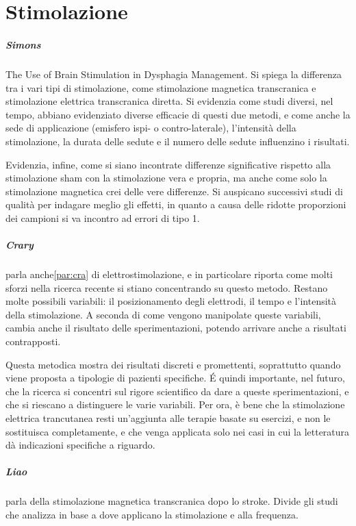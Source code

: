 \chapter{Stimolazione}
\paragraph{Simons }\label{par:sim}\cite{Simons2017} The Use of Brain 
Stimulation in Dysphagia 
Management.
Si spiega la differenza tra i vari tipi di stimolazione, come stimolazione 
magnetica transcranica e stimolazione elettrica transcranica diretta.
Si evidenzia come studi diversi, nel tempo, abbiano evidenziato diverse 
efficacie di questi due metodi, e come anche la sede di applicazione (emisfero 
ispi- o contro-laterale), l'intensità della stimolazione, la durata delle 
sedute e il numero delle sedute influenzino i risultati.

Evidenzia, infine, come si siano incontrate differenze significative rispetto 
alla stimolazione sham con la stimolazione vera e propria, ma anche come solo 
la stimolazione magnetica crei delle vere differenze.
Si auspicano successivi studi di qualità per indagare meglio gli effetti, in 
quanto a causa delle ridotte proporzioni dei campioni si va incontro ad errori 
di tipo 1.

\paragraph{Crary}\cite{Crary2014} parla anche\ref{par:cra} di 
elettrostimolazione, e in 
particolare riporta come molti sforzi nella ricerca recente si stiano 
concentrando su questo metodo.
Restano molte possibili variabili: il posizionamento degli elettrodi, il tempo 
e l'intensità della stimolazione.
A seconda di come vengono manipolate queste variabili, cambia anche il 
risultato delle sperimentazioni, potendo arrivare anche a risultati 
contrapposti.

Questa metodica mostra dei risultati discreti e promettenti, soprattutto quando 
viene proposta a tipologie di pazienti specifiche.
\'E quindi importante, nel futuro, che la ricerca si concentri sul rigore 
scientifico da dare a queste sperimentazioni, e che si riescano a distinguere 
le varie variabili.
Per ora, è bene che la stimolazione elettrica trancutanea resti un'aggiunta 
alle terapie basate su esercizi, e non le sostituisca completamente, e che 
venga applicata solo nei casi in cui la letteratura dà indicazioni specifiche a 
riguardo.

\paragraph{Liao}\label{par:lia}\cite{Liao2016} parla della stimolazione 
magnetica transcranica dopo lo stroke.
Divide gli studi che analizza in base a dove applicano la stimolazione e alla 
frequenza.

